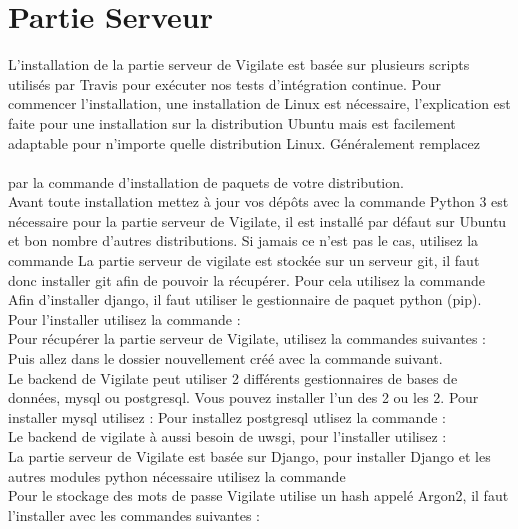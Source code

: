 \section{Partie Serveur}
L’installation de la partie serveur de Vigilate est basée sur plusieurs scripts utilisés par Travis pour exécuter nos tests d’intégration continue.
Pour commencer l’installation, une installation de Linux est nécessaire, l’explication est faite pour une installation sur la distribution Ubuntu mais est facilement adaptable pour n’importe quelle distribution Linux. Généralement remplacez\\
\\
par la commande d’installation de paquets de votre distribution.\\
Avant toute installation mettez à jour vos dépôts avec la commande
Python 3 est nécessaire pour la partie serveur de Vigilate, il est installé par défaut sur Ubuntu et bon nombre d’autres distributions. Si jamais ce n’est pas le cas, utilisez la commande
La partie serveur de vigilate est stockée sur un serveur git, il faut donc installer git afin de pouvoir la récupérer. Pour cela utilisez la commande
Afin d’installer django, il faut utiliser le gestionnaire de paquet python (pip). Pour l’installer utilisez la commande :
\\
Pour récupérer la partie serveur de Vigilate, utilisez la commandes suivantes :
Puis allez dans le dossier nouvellement créé avec la commande suivant.
\\
Le backend de Vigilate peut utiliser 2 différents gestionnaires de bases de données, mysql ou postgresql. Vous pouvez installer l’un des 2 ou les 2. Pour installer mysql utilisez :
Pour installez postgresql utlisez la commande :
\\
Le backend de vigilate à aussi besoin de uwsgi, pour l’installer utilisez :
\\
La partie serveur de Vigilate est basée sur Django, pour installer Django et les autres modules python nécessaire utilisez la commande
\\
Pour le stockage des mots de passe Vigilate utilise un hash appelé Argon2, il faut l’installer avec les commandes suivantes :\\
